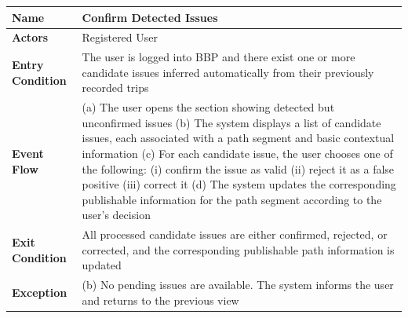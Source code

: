 \begin{table}[H]
\centering
\begin{tabular}{|p{4cm}|p{10cm}|}
\hline
\textbf{Name} & Confirm Detected Issues \\ \hline
\textbf{Actors} & Registered User \\ \hline
\textbf{Entry Condition} & The user is logged into BBP and there exist one or more candidate issues inferred automatically from their previously recorded trips \\ \hline
\textbf{Event Flow} &
(a) The user opens the section showing detected but unconfirmed issues \newline
(b) The system displays a list of candidate issues, each associated with a path segment and basic contextual information \newline
(c) For each candidate issue, the user chooses one of the following: \newline
\hspace*{0.5cm}(i) confirm the issue as valid \newline
\hspace*{0.5cm}(ii) reject it as a false positive \newline
\hspace*{0.5cm}(iii) correct it \newline
(d) The system updates the corresponding publishable information for the path segment according to the user's decision \\ \hline
\textbf{Exit Condition} & All processed candidate issues are either confirmed, rejected, or corrected, and the corresponding publishable path information is updated \\ \hline
\textbf{Exception} &
(b) No pending issues are available. The system informs the user and returns to the previous view \\ \hline
\end{tabular}
\end{table}

